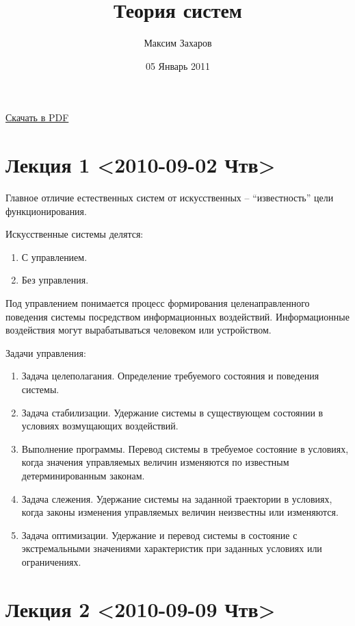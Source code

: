 \documentclass[12pt, russian, oneside, article]{ncc}
\begin{document}
\title{Теория систем}
\author{Максим Захаров}
\date{05 Январь 2011}
\maketitle

\setcounter{tocdepth}{3}
\tableofcontents
\vspace*{1cm}

\href{file:///home/maxim/Documents/Git/lectures/other/TS_Lectures.pdf}{Скачать в PDF}

\section{Лекция 1 <2010-09-02 Чтв>}
\label{sec-1}


Главное отличие естественных систем от искусственных -- ``известность'' цели функционирования.

Искусственные системы делятся:
\begin{enumerate}
\item С управлением.
\item Без управления.
\end{enumerate}

Под управлением понимается процесс формирования целенаправленного поведения системы посредством информационных воздействий. Информационные воздействия могут вырабатываться человеком или устройством.   
  
Задачи управления:
\begin{enumerate}
\item Задача целеполагания. Определение требуемого состояния и поведения системы.
\item Задача стабилизации. Удержание системы в существующем состоянии в условиях возмущающих воздействий.
\item Выполнение программы. Перевод системы в требуемое состояние в условиях, когда значения управляемых величин изменяются по известным детерминированным законам.
\item Задача слежения. Удержание системы на заданной траектории в условиях, когда законы изменения управляемых величин неизвестны или изменяются.
\item Задача оптимизации. Удержание и перевод системы в состояние с экстремальными значениями характеристик при заданных условиях или ограничениях.
\end{enumerate}
\section{Лекция 2 <2010-09-09 Чтв>}
\label{sec-2}
\end{document}
